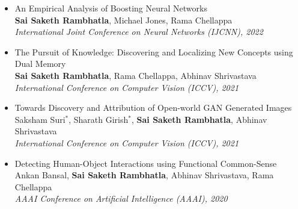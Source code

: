 \documentclass[10pt, letterpaper]{article}
\newcommand{\pub}[3]{\item \begin{minipage}[t]{\linewidth}#1\\#2\\\textcolor{primaryColor!75!black}{\textit{#3}}\end{minipage}} %
\newcommand{\me}{\textbf{Sai Saketh Rambhatla}} %
\let\hrefWithoutArrow\href
\begin{document}
\begin{itemize}[itemsep=3pt, parsep=0pt, topsep=2pt]
\pub{An Empirical Analysis of Boosting Neural Networks}
    {\me, Michael Jones, Rama Chellappa}
    {International Joint Conference on Neural Networks (IJCNN), 2022}

\pub{The Pursuit of Knowledge: Discovering and Localizing New Concepts using Dual Memory}
    {\me, Rama Chellappa, Abhinav Shrivastava}
    {International Conference on Computer Vision (ICCV), 2021}

\pub{Towards Discovery and Attribution of Open-world GAN Generated Images}
    {Saksham Suri$^{*}$, Sharath Girish$^{*}$, \me, Abhinav Shrivastava}
    {International Conference on Computer Vision (ICCV), 2021}





\pub{Detecting Human-Object Interactions using Functional Common-Sense}
    {Ankan Bansal, \me, Abhinav Shrivastava, Rama Chellappa}
    {AAAI Conference on Artificial Intelligence (AAAI), 2020}



\end{itemize}
\end{document}
